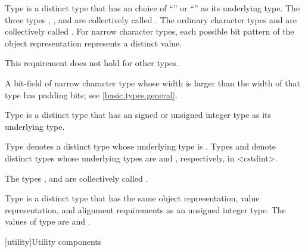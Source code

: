 \documentclass{wg21}
\begin{document}
Type  is a distinct type
that has an  choice of
``'' or ``'' as its underlying type.
The three types , , and 
are collectively called
.
The ordinary character types and 
are collectively called .
For narrow character types,
each possible bit pattern of the object representation represents
a distinct value.
\begin{note}
    This requirement does not hold for other types.
\end{note}
\begin{note}
    A bit-field of narrow character type whose width is larger than
    the width of that type has padding bits; see \ref{basic.types.general}.
\end{note}

\pnum
{}%
%
%
Type  is a distinct type that has
an 
signed or unsigned integer type as its underlying type.

\pnum
{}%
%
%
Type  denotes a distinct type
whose underlying type is .
Types  and  denote distinct types
whose underlying types are  and ,
respectively, in <cstdint>.

\begin{addedblock}
The types ,  and  are collectively called .
\end{addedblock}

\pnum
{}%
%
Type  is a distinct type that has
the same object representation,
value representation, and
alignment requirements as
an  unsigned integer type.
The values of type  are
 and .


[utility]{Utility components}
\end{document}
